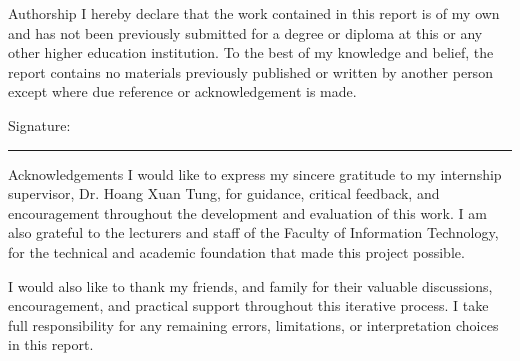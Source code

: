 \documentclass{uetgraduation}
\begin{document}
\begin{preamble}{Authorship}
I hereby declare that the work contained in this report is of my own and has not been previously submitted for a degree or diploma at this or any other higher education institution. To the best of my knowledge and belief, the report contains no materials previously published or written by another person except where due reference or acknowledgement is made.\par\vspace{1cm}
Signature: \rule{6cm}{0.4pt}
\end{preamble}
\begin{preamble}{Acknowledgements}
I would like to express my sincere gratitude to my internship supervisor, Dr. Hoang Xuan Tung, for guidance, critical feedback, and encouragement throughout the development and evaluation of this work. I am also grateful to the lecturers and staff of the Faculty of Information Technology, for the technical and academic foundation that made this project possible.

I would also like to thank my friends, and family for their valuable discussions, encouragement, and practical support throughout this iterative process. I take full responsibility for any remaining errors, limitations, or interpretation choices in this report.
\end{preamble}
\end{document}
